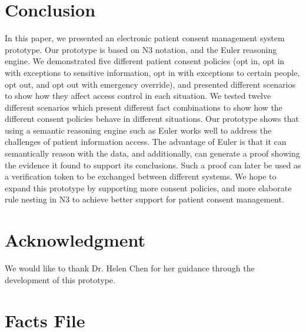 \documentclass[conference]{IEEEtran}
\begin{document}
\section{Conclusion}
\label{concl}

In this paper, we presented an electronic patient consent management system prototype. Our prototype is based on N3 notation, and the Euler reasoning engine.
We demonstrated five different patient consent policies (opt in, opt in with exceptions to sensitive information, opt in with exceptions to certain people, opt
out, and opt out with emergency override), and presented different scenarios to show how they affect access control in each situation. We tested twelve
different scenarios which present different fact combinations to show how the different consent policies behave in different situations. Our prototype shows
that using a semantic reasoning engine such as Euler works well to address the challenges of patient information access. The advantage of Euler is that it can
semantically reason with the data, and additionally, can generate a proof showing the evidence it found to support its conclusions. Such a proof can later be
used as a verification token to be exchanged between different systems. We hope to expand this prototype by supporting more consent policies, and more
elaborate rule nesting in N3 to achieve better support for patient consent management.



\section*{Acknowledgment}


We would like to thank Dr. Helen Chen for her guidance through the development of this prototype.  









\appendices

\onecolumn

\section{Facts File}
\label{sec:facts-file}
\end{document}
